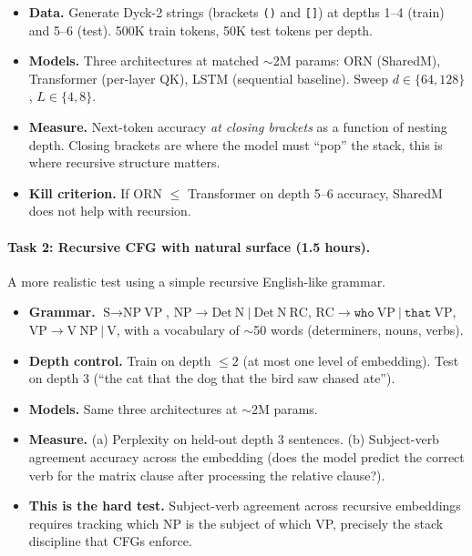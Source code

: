 \documentclass[11pt, a4paper]{article}
\theoremstyle{plain}
\theoremstyle{definition}
\theoremstyle{remark}
\begin{document}
\begin{itemize}[nosep]
\item \textbf{Data.} Generate Dyck-2 strings (brackets \texttt{()} and \texttt{[]}) at depths 1--4 (train) and 5--6 (test). 500K train tokens, 50K test tokens per depth.
\item \textbf{Models.} Three architectures at matched $\sim$2M params: ORN (SharedM), Transformer (per-layer QK), LSTM (sequential baseline). Sweep $d \in \{64, 128\}$, $L \in \{4, 8\}$.
\item \textbf{Measure.} Next-token accuracy \emph{at closing brackets} as a function of nesting depth. Closing brackets are where the model must ``pop'' the stack, this is where recursive structure matters.
\item \textbf{Kill criterion.} If ORN $\leq$ Transformer on depth 5--6 accuracy, SharedM does not help with recursion.
\end{itemize}

\paragraph{Task 2: Recursive CFG with natural surface (1.5 hours).}
A more realistic test using a simple recursive English-like grammar.

\begin{itemize}[nosep]
\item \textbf{Grammar.}
    $\text{S} \to \text{NP}~\text{VP}$,
    $\text{NP} \to \text{Det}~\text{N}~|~\text{Det}~\text{N}~\text{RC}$,
    $\text{RC} \to \texttt{who}~\text{VP}~|~\texttt{that}~\text{VP}$,
    $\text{VP} \to \text{V}~\text{NP}~|~\text{V}$,
    with a vocabulary of $\sim$50 words (determiners, nouns, verbs).
\item \textbf{Depth control.} Train on depth $\leq 2$ (at most one level of embedding). Test on depth 3 (``the cat that the dog that the bird saw chased ate'').
\item \textbf{Models.} Same three architectures at $\sim$2M params.
\item \textbf{Measure.} (a) Perplexity on held-out depth 3 sentences. (b) Subject-verb agreement accuracy across the embedding (does the model predict the correct verb for the matrix clause after processing the relative clause?).
\item \textbf{This is the hard test.} Subject-verb agreement across recursive embeddings requires tracking which NP is the subject of which VP, precisely the stack discipline that CFGs enforce.
\end{itemize}
\end{document}
